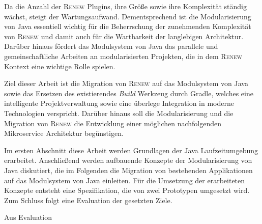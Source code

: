 Da die Anzahl der \textsc{Renew} Plugins, ihre Größe sowie ihre Komplexität ständig wächst, steigt der Wartungsaufwand. Dementsprechend ist die Modularisierung von Java essentiell wichtig für die Beherrschung der zunehmenden Komplexität von \textsc{Renew} und damit auch für die Wartbarkeit der langlebigen Architektur.\newline
Darüber hinaus fördert das Modulsystem von Java das parallele und gemeinschaftliche Arbeiten an modularisierten Projekten, die in dem \textsc{Renew} Kontext eine wichtige Rolle spielen.\newline









Ziel dieser Arbeit ist die Migration von \textsc{Renew} auf das Modulsystem von Java sowie das Ersetzen des existierendes \textit{Build} Werkzeug durch Gradle, welches eine intelligente Projektverwaltung sowie eine überlege Integration in moderne Technologien verspricht. \newline
Darüber hinaus soll die Modularisierung und die Migration von \textsc{Renew} die Entwicklung einer möglichen nachfolgenden Mikroservice Architektur begünstigen.\bigbreak


Im ersten Abschnitt diese Arbeit werden Grundlagen der Java Laufzeitumgebung erarbeitet. Anschließend werden aufbauende Konzepte der Modularisierung von Java diskutiert, die im Folgenden die Migration von bestehenden Applikationen auf das Modulsystem von Java einleiten. Für die Umsetzung der erarbeiteten Konzepte entsteht eine Spezifikation, die von zwei Prototypen umgesetzt wird. Zum Schluss folgt eine Evaluation der gesetzten Ziele.


Aus Evaluation 





